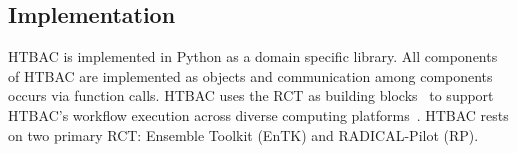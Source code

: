 


\subsection{Implementation}

HTBAC is implemented in Python as a domain specific library. All components
of HTBAC are implemented as objects and communication among components occurs
via function calls. HTBAC uses the RCT as building
blocks~\cite{review_bb_2016} to support HTBAC's workflow execution across
diverse computing platforms~\cite{turilli2017comprehensive}. HTBAC rests on
two primary RCT: Ensemble Toolkit (EnTK) and RADICAL-Pilot (RP).

